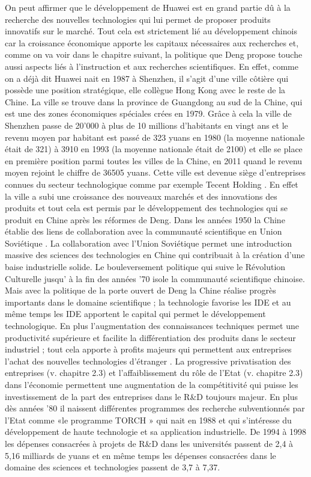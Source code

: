On peut affirmer que le développement de Huawei est en grand partie dû à la recherche des nouvelles technologies qui lui permet de proposer produits innovatifs sur le marché. Tout cela est strictement lié au développement chinois car la croissance économique apporte les capitaux nécessaires aux recherches et, comme on va voir dans le chapitre suivant, la politique que Deng propose touche aussi aspects liés à l’instruction et aux recherches scientifiques. 
En effet, comme on a déjà dit Huawei nait en 1987 à Shenzhen, il s’agit d’une ville côtière qui possède une position stratégique, elle collègue Hong Kong avec le reste de la Chine. La ville se trouve dans la province de Guangdong au sud de la Chine, qui est une des zones économiques spéciales crées en 1979.  Grâce à cela la ville de Shenzhen passe de 20'000 à plus de 10 millions d’habitants en vingt ans et le revenu moyen par habitant est passé de 323 yuans en 1980 (la moyenne nationale était de 321) à 3910 en 1993 (la moyenne nationale était de 2100) et elle se place en première position parmi toutes les villes de la Chine, en 2011 quand le revenu moyen rejoint le chiffre de 36505 yuans.   Cette ville est devenue siège d’entreprises connues du secteur technologique comme par exemple Tecent Holding . En effet la ville a subi une croissance des nouveaux marchés et des innovations des produits et tout cela est permis par le développement des technologies qui se produit en Chine après les réformes de Deng.
Dans les années 1950 la Chine établie des liens de collaboration avec la communauté scientifique en Union Soviétique . La collaboration avec l’Union Soviétique permet une introduction massive des sciences des technologies en Chine qui contribuait à la création d’une baise industrielle solide.  Le bouleversement politique qui suive le Révolution Culturelle jusqu’ à la fin des années ’70 isole la communauté scientifique chinoise.  Mais avec la politique de la porte ouvert de Deng la Chine réalise progrès importants dans le domaine scientifique ; la technologie favorise les IDE et au même temps les IDE apportent le capital qui permet le développement technologique.   En plus l’augmentation des connaissances techniques permet une productivité supérieure et facilite la différentiation des produits dans le secteur industriel ; tout cela apporte à profits majeurs qui permettent aux entreprises l’achat des nouvelles technologies d’étranger . 
La progressive privatisation des entreprises (v. chapitre 2.3) et l’affaiblissement du rôle de l’Etat (v. chapitre 2.3)  dans l’économie permettent une augmentation de la compétitivité qui puisse les investissement de la part des entreprises dans le R&D toujours majeur.  En plus dès années ’80 il naissent différentes programmes des recherche subventionnés par l’Etat comme «le programme TORCH » qui nait en 1988 et qui s’intéresse du développement de haute technologie et sa application industrielle.  De 1994 à 1998 les dépenses consacrées à projets de R&D dans les universités passent de 2,4 à 5,16 milliards de yuans et en même temps les dépenses consacrées dans le domaine des sciences et technologies passent de 3,7 à 7,37.

